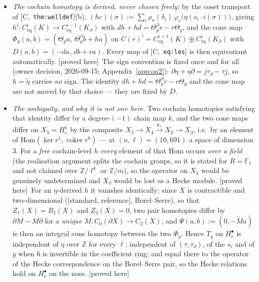 \documentclass[11pt]{article}
\theoremstyle{remark}
\newcommand{\F}{\mathbb{F}}
\newcommand{\Z}{\mathbb{Z}}
\newcommand{\Hom}{\mathrm{Hom}}
\DeclareMathOperator{\coker}{coker}
\newcommand{\HA}[1]{[C,~\texttt{#1}]}      %
\newcommand{\PROVED}{\textsf{[proved here]}}
\newcommand{\STD}{\textsf{[standard, reference]}}
\begin{document}
\begin{enumerate}[label=(A\arabic*)]
\begin{itemize}
    one-dimensional $\tau_\infty$ of \ref{add:bdry} is its Shapiro transcription and a validation route
    only (owner decision, 2026-09-15; Appendix~\ref{app:oq2}).
  \item \emph{The cochain homotopy is derived, never chosen freely}: by the coset transport of
    \HA{thm:welldef}(b),
    $(hc)(\sigma):=\sum_i\rho_n(\delta_i)\,\varphi_c\bigl(\eta(s_i\cdot i(\sigma))\bigr)$, giving
    $h^i:C^i_{\mathrm{eq}}(K)\to C^{i-1}_{\mathrm{eq}}(K_\partial)$ with
    $dh+hd=\Theta_g^\partial r-r\Theta_g$, and the cone map
    $\Phi_g(a,b)=(\Theta_g a,\ \Theta_g^\partial b+ha)$ on
    $C(r)^i=C^{i+1}_{\mathrm{eq}}(K)\oplus C^i_{\mathrm{eq}}(K_\partial)$ with $D(a,b)=(-da,\,db+ra)$.
    Every map of \HA{eq:les} is then equivariant automatically. \PROVED\
    The sign convention is fixed once and for all (owner decision, 2026-09-15;
    Appendix~\ref{app:oq2}): $\partial\eta+\eta\partial=j\tau_\partial-\tau j$, so $h=\tilde\eta$
    carries \emph{no} sign. The identity $dh+hd=\Theta^\partial_gr-r\Theta_g$ and the cone map are
    not moved by that choice --- they are fixed by $D$.
  \item \emph{The ambiguity, and why it is not one here.} Two cochain homotopies satisfying that
    identity differ by a degree-$(-1)$ chain map $k$, and the two cone maps differ on $X_3=H^1_c$ by
    the composite $X_3\to X_4\xrightarrow{\,k_\ast\,}X_2\to X_3$, i.e.\ by an element of
    $\Hom(\ker r^1,\coker r^0)$ --- at $(n,\ell)=(10,691)$ a space of dimension $3$. For a
    \emph{free} cochain-level $h$ \emph{every} element of that $\Hom$ occurs \emph{over a
    field} (the realisation argument splits the cochain groups, so it is stated for
    $R=\F_\ell$ and not claimed over $\Z/\ell^k$ or $\Z/m$), so the operator on $X_3$ would be
    genuinely undetermined and $X_3$ would be lost as a Hecke module. \PROVED\
    For an $\eta$-derived $h$ it vanishes identically: since $X$ is contractible and
    two-dimensional (\STD, Borel--Serre), so that $Z_1(X)=B_1(X)$ and $Z_2(X)=0$, two pair
    homotopies differ by $\partial M-M\partial$ for a \emph{unique} $M:C_0(\partial X)\to C_2(X)$,
    and
    $\Psi(a,b):=(0,-\widetilde M a)$ is then an integral cone homotopy between the two $\Phi_g$.
    Hence $T_q$ on $H^\bullet_c$ is independent of $\eta$ over $\Z$ for every $\ell$; independent of
    $(\tau,\tau_\partial)$, of the $s_i$ and of $g$ when $6$ is invertible in the coefficient ring;
    and equal there to the operator of the Hecke correspondence on the Borel--Serre pair, so the
    Hecke relations hold on $H^\bullet_c$ on the nose. \PROVED

\end{itemize}
\end{enumerate}
\end{document}
